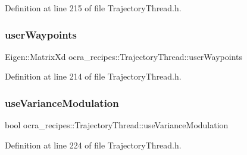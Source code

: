 Definition at line 215 of file Trajectory\+Thread.\+h.

\hypertarget{classocra__recipes_1_1TrajectoryThread_a54a762b3cdd7330322b39f288deda6a9}{}\label{classocra__recipes_1_1TrajectoryThread_a54a762b3cdd7330322b39f288deda6a9} 
\subsubsection{\texorpdfstring{user\+Waypoints}{userWaypoints}}
{\footnotesize\ttfamily Eigen\+::\+Matrix\+Xd ocra\+\_\+recipes\+::\+Trajectory\+Thread\+::user\+Waypoints\hspace{0.3cm}{\ttfamily [protected]}}



Definition at line 214 of file Trajectory\+Thread.\+h.

\hypertarget{classocra__recipes_1_1TrajectoryThread_a963041d784e1078db6a3095a0438a129}{}\label{classocra__recipes_1_1TrajectoryThread_a963041d784e1078db6a3095a0438a129} 
\subsubsection{\texorpdfstring{use\+Variance\+Modulation}{useVarianceModulation}}
{\footnotesize\ttfamily bool ocra\+\_\+recipes\+::\+Trajectory\+Thread\+::use\+Variance\+Modulation\hspace{0.3cm}{\ttfamily [protected]}}



Definition at line 224 of file Trajectory\+Thread.\+h.

\hypertarget{classocra__recipes_1_1TrajectoryThread_a63dbf38d082f3ebcebaee867dba2a8ee}{}\label{classocra__recipes_1_1TrajectoryThread_a63dbf38d082f3ebcebaee867dba2a8ee} 
